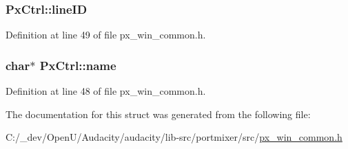 \subsubsection[{\texorpdfstring{line\+ID}{lineID}}]{ Px\+Ctrl\+::line\+ID}\hypertarget{struct_px_ctrl_a80a9f840fab08416ee0c9356ac7eb2a3}{}\label{struct_px_ctrl_a80a9f840fab08416ee0c9356ac7eb2a3}


Definition at line 49 of file px\+\_\+win\+\_\+common.\+h.

\subsubsection[{\texorpdfstring{name}{name}}]{\setlength{\rightskip}{0pt plus 5cm}char$\ast$ Px\+Ctrl\+::name}\hypertarget{struct_px_ctrl_ae94c512ee6d6ebe5d74a2bb80f13cbfd}{}\label{struct_px_ctrl_ae94c512ee6d6ebe5d74a2bb80f13cbfd}


Definition at line 48 of file px\+\_\+win\+\_\+common.\+h.



The documentation for this struct was generated from the following file\+:\begin{DoxyCompactItemize}
\item 
C\+:/\+\_\+dev/\+Open\+U/\+Audacity/audacity/lib-\/src/portmixer/src/\hyperlink{px__win__common_8h}{px\+\_\+win\+\_\+common.\+h}\end{DoxyCompactItemize}
